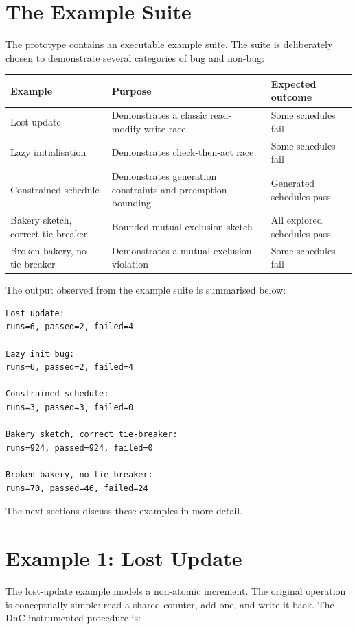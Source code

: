 \documentclass[11pt]{article}
\begin{document}
\section{The Example Suite}

The prototype contains an executable example suite. The suite is deliberately chosen to demonstrate several categories of bug and non-bug:

\begin{longtable}{>{\raggedright\arraybackslash}p{} >{\raggedright\arraybackslash}p{} >{\raggedright\arraybackslash}p{}}
\toprule
Example & Purpose & Expected outcome \\
\midrule
Lost update & Demonstrates a classic read-modify-write race & Some schedules fail \\
Lazy initialisation & Demonstrates check-then-act race & Some schedules fail \\
Constrained schedule & Demonstrates generation constraints and preemption bounding & Generated schedules pass \\
Bakery sketch, correct tie-breaker & Bounded mutual exclusion sketch & All explored schedules pass \\
Broken bakery, no tie-breaker & Demonstrates a mutual exclusion violation & Some schedules fail \\
\bottomrule
\end{longtable}

The output observed from the example suite is summarised below:

\begin{lstlisting}[caption={Example suite summary}]
Lost update:
runs=6, passed=2, failed=4

Lazy init bug:
runs=6, passed=2, failed=4

Constrained schedule:
runs=3, passed=3, failed=0

Bakery sketch, correct tie-breaker:
runs=924, passed=924, failed=0

Broken bakery, no tie-breaker:
runs=70, passed=46, failed=24
\end{lstlisting}

The next sections discuss these examples in more detail.

\section{Example 1: Lost Update}

The lost-update example models a non-atomic increment. The original operation is conceptually simple: read a shared counter, add one, and write it back. The DnC-instrumented procedure is:
\end{document}
